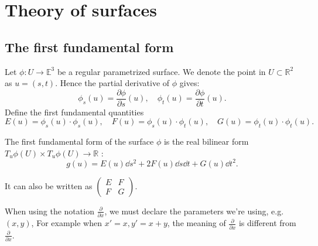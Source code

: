 \section{Theory of surfaces}
\label{sec:Theory of surfaces}

\subsection{The first fundamental form}
\label{sub:The first fundamental form}

Let $\phi: U\to \mathbb{E}^3$ be a regular parametrized surface.
We denote the point in $U \subset \mathbb{R}^2$ as $u=(s,t)$.
Hence the partial derivative of  $\phi$ gives:
 \[
\phi_s(u) = \frac{\partial\phi}{\partial s}(u),\quad
\phi_t(u) = \frac{\partial\phi}{\partial t}(u).
\]
Define the first fundamental quantities
\[
E(u) = \phi_s(u)\cdot \phi_s(u), \quad
F(u) = \phi_s(u)\cdot \phi_t(u), \quad
G(u) = \phi_t(u)\cdot \phi_t(u).
\]

The first fundamental form of the surface $\phi$ is the
real bilinear form $T_u\phi(U)\times T_u\phi(U)\to \mathbb{R}$ :
 \[
g(u) = E(u)\dd s^2 + 2F(u) \dd s \dd t + G(u)\dd t^2.
\]

It can also be written as $\begin{pmatrix}
	E &F\\ F &G
\end{pmatrix}$.

\begin{remark}
	When using the notation $\frac{\partial}{\partial x}$, we must
	declare the parameters we're using, e.g. $(x,y)$,
	For example when $x' = x, y' = x + y$, the meaning
	of $\frac{\partial}{\partial x}$ is different from
	$\frac{\partial}{\partial x}$.
\end{remark}
